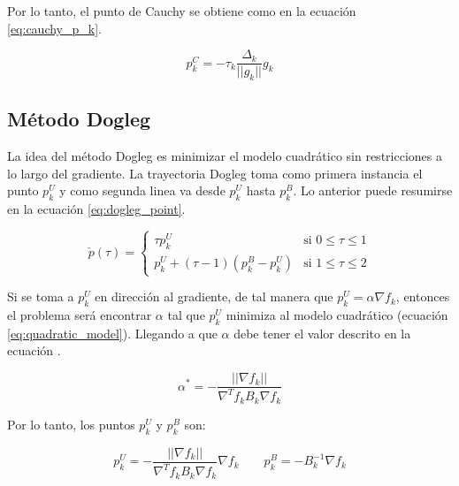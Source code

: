 Por lo tanto, el punto de Cauchy se obtiene como en la ecuación \ref{eq:cauchy_p_k}.

\begin{equation}
    p_k^C = -\tau_k \frac{\Delta_k}{||g_k||} g_k \label{eq:cauchy_p_k}
\end{equation}

\subsection{Método Dogleg}

La idea del método Dogleg es minimizar el modelo cuadrático sin restricciones a lo largo del gradiente. La trayectoria Dogleg toma como primera instancia el punto $p_k^U$ y como segunda linea va desde $p_k^U$ hasta $p_k^B$. Lo anterior puede resumirse en la ecuación \ref{eq:dogleg_point}.

\begin{equation}
    \check{p}(\tau) = \left\{ \begin{matrix}
        \tau p_k^U                   & \text{si } 0 \leq \tau \leq 1 \\
        p_k^U+ (\tau-1)(p_k^B-p_k^U) & \text{si } 1 \leq \tau \leq 2
    \end{matrix} \right. \label{eq:dogleg_point}
\end{equation}

Si se toma a $p_k^U$ en dirección al gradiente, de tal manera que $p_k^U = \alpha \nabla f_k $, entonces el problema será encontrar $\alpha$ tal que $p_k^U$ minimiza al modelo cuadrático (ecuación \ref*{eq:quadratic_model}). Llegando a que $\alpha$ debe tener el valor descrito en la ecuación .

\begin{equation}
    \alpha^* = -\frac{||\nabla f_k||}{\nabla^T f_k B_k \nabla f_k}
\end{equation}

Por lo tanto, los puntos $p_k^U$ y $p_k^B$ son:

\begin{equation*}
    p_k^U = -\frac{||\nabla f_k||}{\nabla^T f_k B_k \nabla f_k} \nabla f_k \qquad p_k^B = -B_k^{-1}\nabla f_k
\end{equation*}